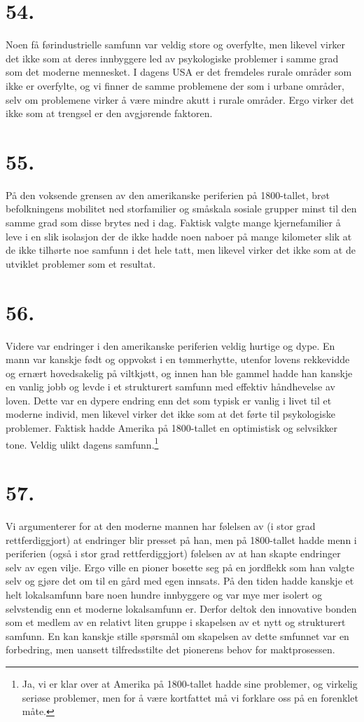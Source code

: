 \documentclass[oneside]{book}
\begin{document}
\section*{54.}
Noen få førindustrielle samfunn var veldig store og overfylte, men likevel
virker det ikke som at deres innbyggere led av psykologiske problemer i samme
grad som det moderne mennesket. I dagens USA er det fremdeles rurale områder
som ikke er overfylte, og vi finner de samme problemene der som i urbane
områder, selv om problemene virker å være mindre akutt i rurale områder. Ergo
virker det ikke som at trengsel er den avgjørende faktoren. 

\section*{55.}
På den voksende grensen av den amerikanske periferien på 1800-tallet, brøt
befolkningens mobilitet ned storfamilier og småskala sosiale grupper minst til
den samme grad som disse brytes ned i dag. Faktisk valgte mange kjernefamilier
å leve i en slik isolasjon der de ikke hadde noen naboer på mange kilometer
slik at de ikke tilhørte noe samfunn i det hele tatt, men likevel virker det
ikke som at de utviklet problemer som et resultat.

\section*{56.}
Videre var endringer i den amerikanske periferien veldig hurtige og dype. En
mann var kanskje født og oppvokst i en tømmerhytte, utenfor lovens rekkevidde
og ernært hovedsakelig på viltkjøtt, og innen han ble gammel hadde han kanskje
en vanlig jobb og levde i et strukturert samfunn med effektiv håndhevelse av
loven. Dette var en dypere endring enn det som typisk er vanlig i livet til et
moderne individ, men likevel virker det ikke som at det førte til psykologiske
problemer. Faktisk hadde Amerika på 1800-tallet en optimistisk og selvsikker
tone. Veldig ulikt dagens samfunn.\footnote{Ja, vi er klar over at Amerika på
1800-tallet hadde sine problemer, og virkelig seriøse problemer, men for å være
kortfattet må vi forklare oss på en forenklet måte.}

\section*{57.}
Vi argumenterer for at den moderne mannen har følelsen av (i stor grad
rettferdiggjort) at endringer blir presset på han, men på 1800-tallet hadde
menn i periferien (også i stor grad rettferdiggjort) følelsen av at han skapte
endringer selv av egen vilje. Ergo ville en pioner bosette seg på en jordflekk
som han valgte selv og gjøre det om til en gård med egen innsats. På den tiden
hadde kanskje et helt lokalsamfunn bare noen hundre innbyggere og var mye mer
isolert og selvstendig enn et moderne lokalsamfunn er. Derfor deltok den
innovative bonden som et medlem av en relativt liten gruppe i skapelsen av et
nytt og strukturert samfunn. En kan kanskje stille spørsmål om skapelsen av
dette smfunnet var en forbedring, men uansett tilfredsstilte det pionerens
behov for maktprosessen.
\end{document}
